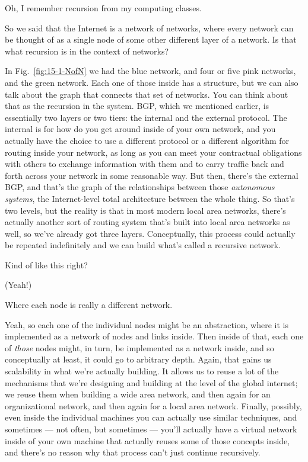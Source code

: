 \mmm Oh, I remember recursion from my computing classes.

So we said that the Internet is a network of networks, where every network can be thought of as a single node of some other different layer of a network. Is that what recursion is in the context of networks?

\rrr In Fig.~\ref{fig:15-1-NofN} we had the blue network, and four or five pink networks, and the green network. Each one of those inside has a structure, but we can also talk about the graph that connects that set of networks. You can think about that as the recursion in the system. BGP, which we mentioned earlier, is essentially two layers or two tiers: the internal and the external protocol. The internal is for how do you get around inside of your own network, and you actually have the choice to use a different protocol or a different algorithm for routing inside your network, as long as you can meet your contractual obligations with others to exchange information with them and to carry traffic back and forth across your network in some reasonable way. But then, there's the external BGP, and that's the graph of the relationships between those \emph{autonomous systems}, the Internet-level total architecture between the whole thing. So that's two levels, but the reality is that in most modern local area networks, there's actually another sort of routing system that's built into local area networks as well, so we've already got three layers. Conceptually, this process could actually be repeated indefinitely and we can build what's called a recursive network.

\mmm Kind of like this right? 

\rrr (Yeah!) 

\mmm Where each node is really a different network.

\rrr Yeah, so each one of the individual nodes might be an abstraction, where it is implemented as a network of nodes and links inside. Then inside of that, each one of \emph{those} nodes might, in turn, be implemented as a network inside, and so conceptually at least, it could go to arbitrary depth. Again, that gains us scalability in what we're actually building. It allows us to reuse a lot of the mechanisms that we're designing and building at the level of the global internet; we reuse them when building a wide area network, and then again for an organizational network, and then again for a local area network. Finally, possibly, even inside the individual machines you can actually use similar techniques, and sometimes --- not often, but sometimes --- you'll actually have a virtual network inside of your own machine that actually reuses some of those concepts inside, and there's no reason why that process can't just continue recursively.

